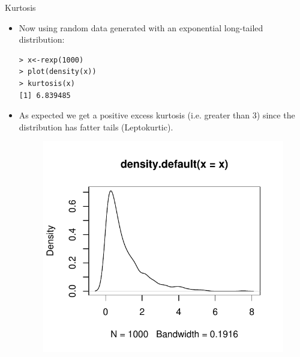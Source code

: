 \documentclass[handout]{beamer}
\begin{document}
\begin{frame}[fragile]{Kurtosis}

\scriptsize{
\begin{itemize} 
 \item Now using random data generated with an exponential long-tailed distribution:
 
 \begin{verbatim}
> x<-rexp(1000)
> plot(density(x))
> kurtosis(x)
[1] 6.839485
 \end{verbatim}

 \item  As expected we get a positive excess kurtosis (i.e. greater than 3) since the distribution has fatter tails (Leptokurtic).

 
   \begin{figure}[h!]
	\centering
	\includegraphics[scale=0.4]{pics/kurt2.pdf}
	\end{figure} 
 
 
 
\end{itemize}

}

 
\end{frame}
\end{document}
